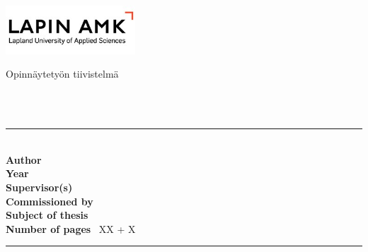 \vspace{3.0cm}
\begin{center}\LARGE
\otsikko 
\end{center}

\vspace{9cm}
\begin{center}
\tekija
\end{center}

\vspace{0.5cm}
\begin{center}
\opinnaytetyo 
\\ \koulutus
\\ \tutkintonimike
\\ \end{center}

\vspace{0.5cm}
\begin{center}\LARGE
\aika
\end{center}


\newpage\null
\pagestyle{empty}  %
\vspace{1.27cm}

\noindent\begin{minipage}{0.4\textwidth}
\noindent\includegraphics[width=4.83cm]{ylatunnisteLogo}
\end{minipage}
\begin{minipage}{0.6\textwidth}\raggedleft
Opinnäytetyön tiivistelmä\\
\end{minipage}
\noindent \Koulutus \\
\tutkintonimike \\
\rule{\textwidth}{.2mm}\\

%
%

\vspace{1mm}\noindent \textbf{Author} \	\tekija\\
\vspace{1mm}\noindent \textbf{Year} \	\aika \\
\vspace{1mm}\noindent \textbf{Supervisor(s)}	\ \Ohjaajat \\
\vspace{1mm}\noindent \textbf{Commissioned by}	\ \Toimeksiantaja \\
\vspace{1mm}\noindent \textbf{Subject of thesis} \	\opinnaytetyo \\
\vspace{1mm}\noindent \textbf{Number of pages} \	XX + X \\
\rule{\textwidth}{.2mm}\\

